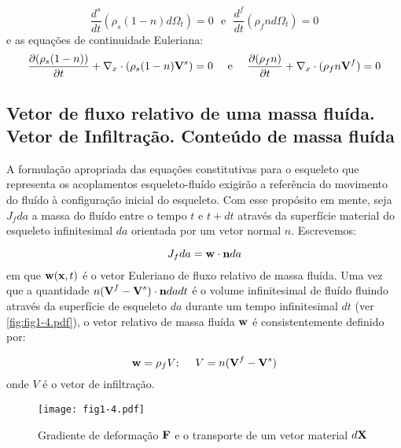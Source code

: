\documentclass[
	11pt, %
	fleqn, %
	a4paper, %
]{LegrandOrangeBook}
\begin{document}
\begin{equation}
	\label{eq:balanco_de_massa2}	
	\dfrac{d^s}{dt}(\rho_s(1-n)d\Omega_t) = 0~~~ \text{e}~~~\dfrac{d^f}{dt}(\rho_fnd\Omega_t) = 0 
\end{equation}
e as equações de continuidade Euleriana:
\begin{equation}
	\label{eq:balanco_de_massa3}	
	\dfrac{\partial(\rho_s(1-n))}{\partial t} + \nabla_x \cdot (\rho_s(1-n)\textbf{V}^s)=0 ~~~~ \text{e} ~~~~ \dfrac{\partial(\rho_fn)}{\partial t} + \nabla_x \cdot (\rho_fn\textbf{V}^f)=0
\end{equation}

\subsection{Vetor de fluxo relativo de uma massa fluída. Vetor de Infiltração. Conteúdo de massa fluída}

A formulação apropriada das equações constitutivas para o esqueleto que representa os acoplamentos esqueleto-fluído exigirão a referência do movimento do fluído à configuração inicial do esqueleto. Com esse propósito em mente, seja $J_fda$ a massa do fluído entre o tempo $t$ e $t+dt$ através da superfície material do esqueleto infinitesimal $da$ orientada por um vetor normal $n$. Escrevemos: 

\begin{equation}
	\label{eq:fluxo relativo1}	J_fda = \textbf{w} \cdot \textbf{n} da
\end{equation}
em que $\textbf{w}(\textbf{x},t)$ é o vetor Euleriano de fluxo relativo de massa fluída. Uma vez que a quantidade $n(\textbf{V}^f-\textbf{V}^s)\cdot \textbf{n} dadt$ é o volume infinitesimal de fluído fluindo através da superfície de esqueleto $da$ durante um tempo infinitesimal $dt$ (ver \autoref{fig:fig1-4.pdf}), o vetor relativo de massa fluída $\textbf{w}$ é consistentemente definido por:

\begin{equation}
	\label{eq:fluxo relativo1}	
	\textbf{w} = \rho_f V; ~~~~ V = n(\textbf{V}^f-\textbf{V}^s)
\end{equation}
onde $V$ é o vetor de infiltração. 

\begin{figure}[H] %
	\centering %
	\texttt{[image: fig1-4.pdf]} %
	\caption{Gradiente de deformação $\textbf{F}$ e o transporte de um vetor material $d\textbf{X}$}
	\label{fig:fig1-4.pdf} %
\end{figure}
\end{document}
